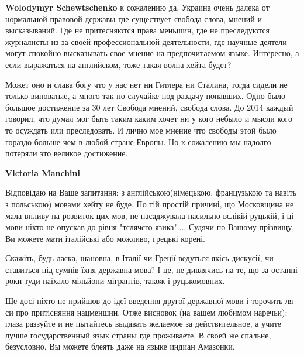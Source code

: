 \begin{itemize}
\begin{itemize}
\textbf{Wolodymyr Schewtschenko} к сожалению да, Украина очень далека от нормальной правовой державы где существует свобода слова, мнений и высказываний. Где не притесняются права меньшин, где не преследуются журналисты из-за своей профессиональной деятельности, где научные деятели могут спокойно высказывать свое мнение на предпочитаемом языке. Интересно, а если выражаться на английском, тоже такая волна хейта будет?


Может оно и слава богу что у нас нет ни Гитлера ни Сталина, тогда сидели не только виноватые, а много так по случайке под раздачу попавших. Одно было большое достижение за 30 лет Свобода мнений, свобода слова. До 2014 каждый говорил, что думал мог быть таким каким хочет ни у кого небыло и мысли кого то осуждать или преследовать. И лично мое мнение что свободы этой было гораздо больше чем в любой стране Европы. Но к сожалению мы надолго потеряли это великое достижение.


\textbf{Victoria Manchini} 

Відповідаю на Ваше запитання: з англійською(німецькою, французькою та навіть з
польською) мовами хейту не буде. По тій простій причині, що Московщина не мала
впливу на розвиток цих мов, не насаджувала насильно вєлікій руцькій, і ці мови
ніхто не опускав до рівня "тєлячєго язика".... Судячи по Вашому прізвищу, Ви
можете мати італійські або можливо, грецькі корені. 

Скажіть, будь ласка, шановна, в Італії чи Греції ведуться якісь дискусії, чи
ставиться під сумнів їхня державна мова? І це, не дивлячись на те, що за
останні роки туди наїхало мільйони мігрантів, також і руцькомовних. 

Ще досі ніхто не прийшов до ідеї введення другої державної мови і торочить ля
си про притісняння нацменшин. Отже висновок (на вашем любимом наречьи): глаза
раззуйте и не пытайтесь выдавать желаемое за действительное, а учите лучше
государственный язык страны где проживаете. В своей же спальне, безусловно, Вы
можете блеять даже на языке индиан Амазонки.



\end{itemize}
\end{itemize}
